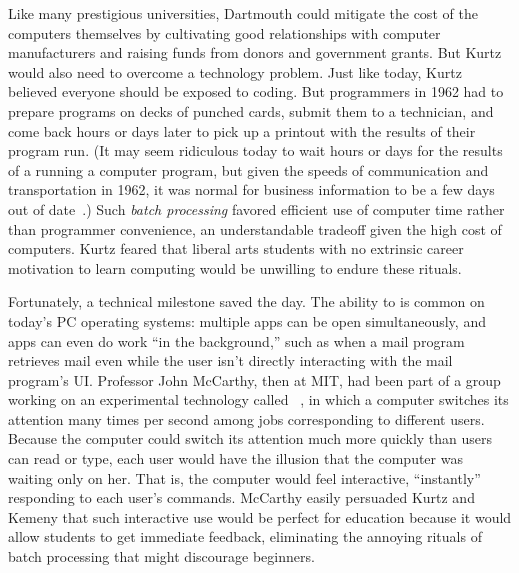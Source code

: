 Like many prestigious universities, Dartmouth could mitigate the cost of
the computers themselves by cultivating good relationships with
computer manufacturers and raising funds from donors and government
grants.
But Kurtz would also need to overcome a technology problem.
Just like today, Kurtz believed everyone should be exposed to coding.
But programmers in 1962 had to prepare programs on decks of punched cards,
submit them to a technician,
and come back hours or days later to pick up a printout with
the results of their program run.
(It may seem ridiculous today to wait hours or days for the results of a
running a computer program, but given the speeds of 
communication and transportation in 1962, it was normal for
business information to be a few days out of
date~\cite{ceruzzi}.) 
Such \emph{batch processing} favored efficient use of computer time rather
than programmer convenience, an understandable
tradeoff given the high cost of computers.
Kurtz feared that liberal arts students with no
extrinsic career motivation to learn computing would be unwilling
to endure these rituals.

Fortunately, a technical milestone saved the day.
The ability to  is common on today's
PC operating systems: multiple apps can be open
simultaneously, and apps can even do work ``in the background,''
such as when a mail program
retrieves mail even while the user isn't
directly interacting with the mail program's UI.
Professor John McCarthy, then at MIT, had been part of a group working
on an experimental technology called
~\cite{corbato62timesharing}, in which a computer
switches its attention many times per second among jobs corresponding to
different users.
Because the computer could switch its attention much more quickly than
users can read or type, each user would have the illusion that the computer
was waiting only on her.  That is, the computer would feel
interactive, ``instantly'' responding to each user's commands.
McCarthy easily persuaded Kurtz and Kemeny that such interactive
use would be perfect for education because it would allow
students to get
immediate feedback, eliminating the annoying rituals of batch
processing that might discourage beginners.

